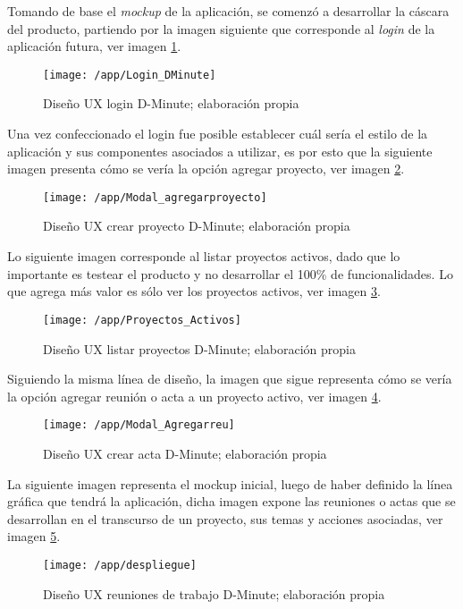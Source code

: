 Tomando de base el \textit{mockup} de la aplicación, se comenzó a desarrollar la cáscara del producto, partiendo por la imagen siguiente que corresponde al \textit{login} de la aplicación futura, ver imagen \ref{img4-7}.

\begin{figure}[!h]
\centering
\texttt{[image: /app/Login\_DMinute]}
\caption{Diseño UX login D-Minute; elaboración propia} 
\label{img4-7}
\end{figure}

Una vez confeccionado el login fue posible establecer cuál sería el estilo de la aplicación y sus componentes asociados a utilizar, es por esto que la siguiente imagen presenta cómo se vería la opción agregar proyecto, ver imagen \ref{img4-8}.

\begin{figure}[!h]
\centering
\texttt{[image: /app/Modal\_agregarproyecto]}
\caption{Diseño UX crear proyecto D-Minute; elaboración propia} 
\label{img4-8}
\end{figure}

Lo siguiente imagen corresponde al listar proyectos activos, dado que lo importante es testear el producto y no desarrollar el 100\% de funcionalidades. Lo que agrega más valor es sólo ver los proyectos activos, ver imagen \ref{img4-9}.

\begin{figure}[!h]
\centering
\texttt{[image: /app/Proyectos\_Activos]}
\caption{Diseño UX listar proyectos D-Minute; elaboración propia} 
\label{img4-9}
\end{figure}

Siguiendo la misma línea de dise\~no, la imagen que sigue representa cómo se vería la opción agregar reunión o acta a un proyecto activo, ver imagen \ref{img4-10}.

\begin{figure}[!h]
\centering
\texttt{[image: /app/Modal\_Agregarreu]}
\caption{Diseño UX crear acta D-Minute; elaboración propia} 
\label{img4-10}
\end{figure}

La siguiente imagen representa el mockup inicial, luego de haber definido la línea gráfica que tendrá la aplicación, dicha imagen expone las reuniones o actas que se desarrollan en el transcurso de un proyecto, sus temas y acciones asociadas, ver imagen \ref{img4-11}.

\begin{figure}[!h]
\centering
\texttt{[image: /app/despliegue]}
\caption{Diseño UX reuniones de trabajo D-Minute; elaboración propia} 
\label{img4-11}
\end{figure}

